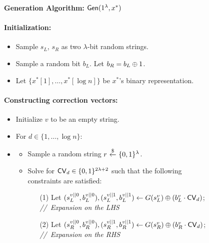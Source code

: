 \begin{figure}[p]
    \begin{minipage}{\textwidth}
        \begin{mdframed}
            \begin{center}
                \textbf{Generation Algorithm:} ${\sf Gen}(1^\lambda, x^*)$
            \end{center}
            
            \paragraph{Initialization:} 
            \begin{itemize}
                \item Sample $s_L$, $s_R$ as two $\lambda$-bit random strings. 
                \item Sample a random bit $b_L$. Let $b_R=b_L\oplus 1$. 
                \item Let $\{x^*[1],\dots,x^*[\log n]\}$ be $x^*$'s binary representation.
            \end{itemize}
            
            
            \paragraph{Constructing correction vectors:}  
            \begin{itemize}[label={},leftmargin=*]
                \item Initialize $v$ to be an empty string.
                \item For $d\in \{1,\dots, \log n\}$: 
                \item 
                \begin{itemize}
                    \item Sample a random string $r~{\overset{\$}{\leftarrow}}~ \{0,1\}^{\lambda}$.
                    \item Solve for 
${\sf CV}_d\in\{0,1\}^{2\lambda+2}$ such that the following constraints
are satisfied:
                    \begin{enumerate}
                        \item[(1)] Let $(s^{v||0}_L, b^{v||0}_L), (s^{v||1}_L, b^{v||1}_L) \leftarrow G(s^v_L) \oplus (b^v_L \cdot {\sf CV}_d)$; \hfill \textit{//~Expansion on the LHS}
                        \item[(2)] Let $(s^{v||0}_R, b^{v||0}_R), (s^{v||1}_R, b^{v||1}_R) \leftarrow G(s^v_R) \oplus (b^v_R \cdot {\sf CV}_d)$; \hfill \textit{//~Expansion on the RHS}


\end{enumerate}
\end{itemize}
\end{itemize}
\end{mdframed}
\end{minipage}
\end{figure}
